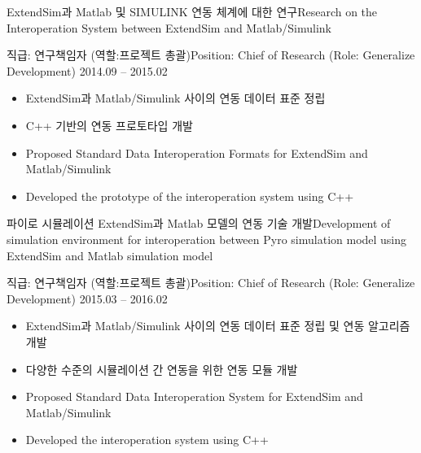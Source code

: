 \documentclass[english,full]{resume_structure}
\begin{document}
\begin{Project}
{ExtendSim과 Matlab 및 SIMULINK 연동 체계에 대한 연구}{Research on the Interoperation System between ExtendSim and Matlab/Simulink}
{}{} 
{
\ResumeSubSection %
    {직급: 연구책임자 (역할:프로젝트 총괄)}{Position: Chief of Research (Role: Generalize Development)}
    {2014.09 -- 2015.02}
    {
      \begin{itemize}
        \item ExtendSim과 Matlab/Simulink 사이의 연동 데이터 표준 정립
        \item C++ 기반의 연동 프로토타입 개발
      \end{itemize}
    }
    {
      \begin{itemize}
        \item Proposed Standard Data Interoperation Formats for ExtendSim and Matlab/Simulink
        \item Developed the prototype of the interoperation system using C++
      \end{itemize}
    }
}

{파이로 시뮬레이션 ExtendSim과 Matlab 모델의 연동 기술 개발}{Development of simulation environment for interoperation between Pyro simulation model using ExtendSim and Matlab simulation model}
{}{} 
{
\ResumeSubSection %
    {직급: 연구책임자 (역할:프로젝트 총괄)}{Position: Chief of Research (Role: Generalize Development)}
    {2015.03 -- 2016.02}
    {
      \begin{itemize}
        \item ExtendSim과 Matlab/Simulink 사이의 연동 데이터 표준 정립 및 연동 알고리즘 개발
        \item 다양한 수준의 시뮬레이션 간 연동을 위한 연동 모듈 개발 
      \end{itemize}
    }
    {
      \begin{itemize}
        \item Proposed Standard Data Interoperation System for ExtendSim and Matlab/Simulink
        \item Developed the interoperation system using C++
      \end{itemize}
    }
}


\end{Project}
\end{document}
